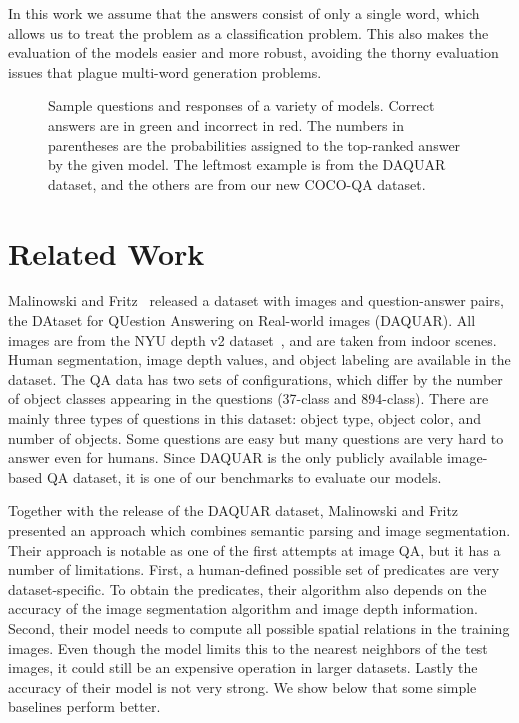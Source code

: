 \documentclass{article} \usepackage{nips15submit_e,times}
\renewcommand{\#}[1]{\textbf{#1}}
\begin{document}
In this work we assume that the answers consist of only a single word,
which allows us to treat the problem as a classification problem. This also
makes the evaluation of the models easier and more robust, avoiding the thorny
evaluation issues that plague multi-word generation problems.

\begin{figure}
\centering
\scriptsize


\caption{Sample questions and responses of a variety of models. 
Correct answers are in green and incorrect in red. The numbers in parentheses 
are the probabilities assigned to the top-ranked answer by the given model. 
The leftmost example is from the DAQUAR dataset, and the others are from our 
new COCO-QA dataset.}
\label{fig:demo_questions}
\end{figure}

\section{Related Work}
Malinowski and Fritz~\cite{malinowski14a} released a dataset with images and
question-answer pairs, the DAtaset for QUestion Answering on Real-world images
(DAQUAR). All images are from the NYU depth v2 dataset~\cite{silberman12}, and
are taken from indoor scenes. Human segmentation, image depth values, and
object labeling are available in the dataset. The QA data has two sets of
configurations, which differ by the number of object classes appearing in the
questions (37-class and 894-class). There are mainly three types of questions
in this dataset: object type, object color, and number of objects. Some
questions are easy but many questions are very hard to answer even for humans.
Since DAQUAR is the only publicly available image-based QA dataset, it is one
of our benchmarks to evaluate our models.

Together with the release of the DAQUAR dataset, Malinowski and Fritz presented
an approach which combines semantic parsing and image segmentation. Their
approach is notable as one of the first attempts at image QA, but it has a
number of limitations. First, a human-defined possible set of predicates are
very dataset-specific. To obtain the predicates, their algorithm also depends
on the accuracy of the image segmentation algorithm and image depth
information.  Second, their model needs to compute all possible spatial
relations in the training images. Even though the model limits this to the
nearest neighbors of the test images, it could still be an expensive operation
in larger datasets.  Lastly the accuracy of their model is not very strong. We
show below that some simple baselines perform better.
\end{document}
